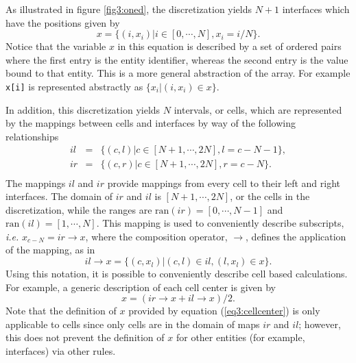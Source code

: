 
As illustrated in figure \ref{fig3:oned}, the discretization yields
$N+1$ interfaces which have the positions given by
\begin{equation}
x = \lbrace (i,x_i) | i \in [0, \cdots, N], x_i = i/N \rbrace.
\label{eq3:interfacex}
\end{equation}
Notice that the variable $x$ in this equation is described by a set of
ordered pairs where the first entry is the entity identifier, whereas
the second entry is the value bound to that entity.  This is a more
general abstraction of the array.  For example {\tt x[i]} is
represented abstractly as $\lbrace x_i | (i,x_i) \in x \rbrace$.

In addition, this discretization yields $N$ intervals, or cells, which
are represented by the mappings between cells and interfaces by way of
the following relationships
\begin{equation}
\begin{array}{rcl}
il & = & \lbrace (c,l) | c \in [N+1, \cdots, 2N], l = c-N-1 \rbrace,\\
ir & = & \lbrace (c,r) | c \in [N+1, \cdots, 2N], r = c-N \rbrace.\\
\end{array}
\label{eq3:cellmaps}
\end{equation}
The mappings $il$ and $ir$ provide mappings from every cell to their
left and right interfaces.  The domain of $ir$ and $il$ is $[N+1,
\cdots, 2N]$, or the cells in the discretization, while the ranges are
$\mathrm{ran}(ir) = [0, \cdots, N-1]$ and $\mathrm{ran}(il) = [1, \cdots, N]$.  This
mapping is used to conveniently describe subscripts, {\it i.e.}
$x_{c-N} = ir \rightarrow x$, where the composition operator,
$\rightarrow$, defines the application of the mapping, as in
\begin{equation}
il\rightarrow x = \lbrace (c,x_l) | (c,l) \in il, (l,x_l) \in x \rbrace.
\end{equation}
Using this notation, it is possible to conveniently describe cell
based calculations.  For example, a generic description of each cell
center is given by
\begin{equation}
\label{eq3:cellcenter}
x = (ir \rightarrow x + il \rightarrow x)/2.
\end{equation}
Note that the definition of $x$ provided by equation
(\ref{eq3:cellcenter}) is only applicable to cells since only cells are in
the domain of maps $ir$ and $il$; however, this does not prevent the
definition of $x$ for other entities (for example, interfaces) via
other rules.

